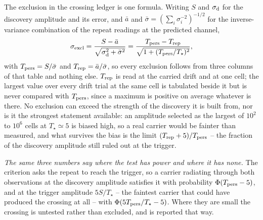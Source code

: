 The exclusion in the crossing ledger is one formula. Writing $S$ and
$\sigma_{\rm d}$ for the discovery amplitude and its error, and $\bar{a}$ and
$\bar{\sigma}=(\sum_i\sigma_i^{-2})^{-1/2}$ for the inverse-variance
combination of the repeat readings at the predicted channel,
\begin{equation}
\sigma_{\rm excl}=\frac{S-\bar{a}}
{\sqrt{\sigma_{\rm d}^{2}+\bar{\sigma}^{2}}}
=\frac{T_{\rm pers}-T_{\rm rep}}{\sqrt{1+(T_{\rm pers}/T_\star)^{2}}},
\label{eq:excl}
\end{equation}
with $T_{\rm pers}=S/\bar{\sigma}$ and $T_{\rm rep}=\bar{a}/\bar{\sigma}$, so
every exclusion follows from three columns of that table and nothing else.
$T_{\rm rep}$ is read at the carried drift and at one cell; the largest value
over every drift trial at the same cell is tabulated beside it but is never
compared with $T_{\rm pers}$, since a maximum is positive on average whatever
is there. No exclusion can exceed the strength of the discovery it is built
from, nor is it the strongest statement available: an amplitude selected as
the largest of $10^{2}$ to $10^{6}$ cells at $T_\star\simeq5$ is biased high,
so a real carrier would be fainter than measured, and what survives the bias
is the limit $(T_{\rm rep}+5)/T_{\rm pers}$ -- the fraction of the discovery
amplitude still ruled out at the trigger.

\emph{The same three numbers say where the test has power and where it has
none.} The criterion asks the repeat to reach the trigger, so a carrier
radiating through both observations at the discovery amplitude satisfies it
with probability $\Phi(T_{\rm pers}-5)$, and at the trigger amplitude
$5S/T_\star$ -- the faintest carrier that could have produced the crossing
at all -- with $\Phi(5T_{\rm pers}/T_\star-5)$. Where they are small the
crossing is untested rather than excluded, and is reported that way.

